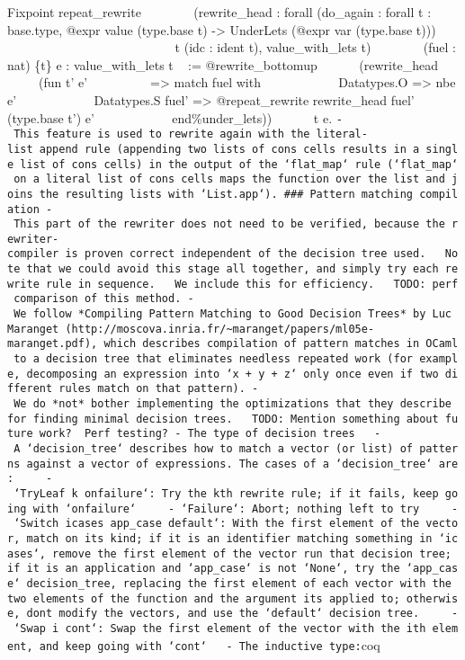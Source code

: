 Fixpoint repeat\_rewrite ~ ~ ~ ~ ~(rewrite\_head : forall (do\_again :
forall t : base.type, @expr value (type.base t) -\textgreater{}
UnderLets (@expr var (type.base t))) ~ ~ ~ ~ ~ ~ ~ ~ ~ ~ ~ ~ ~ ~ ~ ~ ~ ~
t (idc : ident t), value\_with\_lets t) ~ ~ ~ ~ ~(fuel : nat) \{t\} e :
value\_with\_lets t ~ := @rewrite\_bottomup ~ ~ ~ ~(rewrite\_head ~ ~ ~
~ ~ (fun t' e' ~ ~ ~ ~ ~ ~=\textgreater{} match fuel with ~ ~ ~ ~ ~ ~ ~
\textbar{} Datatypes.O =\textgreater{} nbe e' ~ ~ ~ ~ ~ ~ ~ \textbar{}
Datatypes.S fuel' =\textgreater{} @repeat\_rewrite rewrite\_head fuel'
(type.base t') e' ~ ~ ~ ~ ~ ~ ~ end\%under\_lets)) ~ ~ ~ ~t e.
\texttt{-\ This\ feature\ is\ used\ to\ rewrite\ again\ with\ the\ literal-list\ append\ rule\ (appending\ two\ lists\ of\ cons\ cells\ results\ in\ a\ single\ list\ of\ cons\ cells)\ in\ the\ output\ of\ the\ `flat\_map`\ rule\ (`flat\_map`\ on\ a\ literal\ list\ of\ cons\ cells\ maps\ the\ function\ over\ the\ list\ and\ joins\ the\ resulting\ lists\ with\ `List.app`).\ \#\#\#\ Pattern\ matching\ compilation\ -\ This\ part\ of\ the\ rewriter\ does\ not\ need\ to\ be\ verified,\ because\ the\ rewriter-compiler\ is\ proven\ correct\ independent\ of\ the\ decision\ tree\ used.\ \ \ Note\ that\ we\ could\ avoid\ this\ stage\ all\ together,\ and\ simply\ try\ each\ rewrite\ rule\ in\ sequence.\ \ \ We\ include\ this\ for\ efficiency.\ \ \ TODO:\ perf\ comparison\ of\ this\ method.\ -\ We\ follow\ *Compiling\ Pattern\ Matching\ to\ Good\ Decision\ Trees*\ by\ Luc\ Maranget\ (http://moscova.inria.fr/\textasciitilde{}maranget/papers/ml05e-maranget.pdf),\ which\ describes\ compilation\ of\ pattern\ matches\ in\ OCaml\ to\ a\ decision\ tree\ that\ eliminates\ needless\ repeated\ work\ (for\ example,\ decomposing\ an\ expression\ into\ `x\ +\ y\ +\ z`\ only\ once\ even\ if\ two\ different\ rules\ match\ on\ that\ pattern).\ -\ We\ do\ *not*\ bother\ implementing\ the\ optimizations\ that\ they\ describe\ for\ finding\ minimal\ decision\ trees.\ \ \ TODO:\ Mention\ something\ about\ future\ work?\ \ Perf\ testing?\ -\ The\ type\ of\ decision\ trees\ \ \ -\ A\ `decision\_tree`\ describes\ how\ to\ match\ a\ vector\ (or\ list)\ of\ patterns\ against\ a\ vector\ of\ expressions.\ The\ cases\ of\ a\ `decision\_tree`\ are:\ \ \ \ \ -\ `TryLeaf\ k\ onfailure`:\ Try\ the\ kth\ rewrite\ rule;\ if\ it\ fails,\ keep\ going\ with\ `onfailure`\ \ \ \ \ -\ `Failure`:\ Abort;\ nothing\ left\ to\ try\ \ \ \ \ -\ `Switch\ icases\ app\_case\ default`:\ With\ the\ first\ element\ of\ the\ vector,\ match\ on\ its\ kind;\ if\ it\ is\ an\ identifier\ matching\ something\ in\ `icases`,\ remove\ the\ first\ element\ of\ the\ vector\ run\ that\ decision\ tree;\ if\ it\ is\ an\ application\ and\ `app\_case`\ is\ not\ `None`,\ try\ the\ `app\_case`\ decision\_tree,\ replacing\ the\ first\ element\ of\ each\ vector\ with\ the\ two\ elements\ of\ the\ function\ and\ the\ argument\ its\ applied\ to;\ otherwise,\ don\textquotesingle{}t\ modify\ the\ vectors,\ and\ use\ the\ `default`\ decision\ tree.\ \ \ \ \ -\ `Swap\ i\ cont`:\ Swap\ the\ first\ element\ of\ the\ vector\ with\ the\ ith\ element,\ and\ keep\ going\ with\ `cont`\ \ \ -\ The\ inductive\ type:}coq
